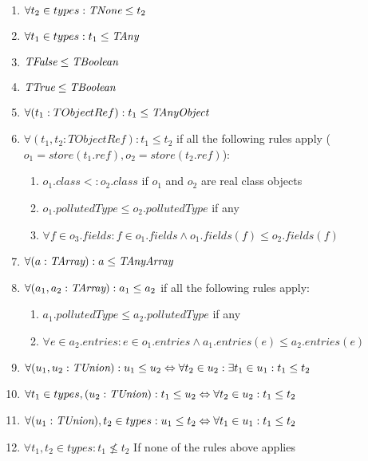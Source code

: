 \documentclass[a4paper]{article}
\begin{document}
\begin{enumerate}
  \item $\forall t_2 \in types : \emph{TNone} \leq t_2$
  \item $\forall t_1 \in types : t_1 \leq \emph{TAny}$
  \item $\emph{TFalse} \leq \emph{TBoolean}$
  \item $\emph{TTrue} \leq \emph{TBoolean}$
  \item $\forall (t_1:  TObjectRef): t_1 \leq \emph{TAnyObject}$
  \item $\forall (t_1,t_2: TObjectRef): t_1 \leq t_2$
    if all the following rules apply ($o_1 = store(t_1.ref), o_2 = store(t_2.ref)$):
    \begin{enumerate}
        \item $o_1.class <: o_2.class$ if $o_1$ and $o_2$ are real class objects
        \item $o_1.pollutedType \leq o_2.pollutedType$ if any
        \item $\forall f \in o_3.fields: f \in o_1.fields \wedge o_1.fields(f)
          \leq o_2.fields(f)$
    \end{enumerate}
  \item $\forall (a: \emph{TArray}) : a \leq \emph{TAnyArray}$
  \item $\forall (a_1,a_2: \emph{TArray}) : a_1 \leq a_2$
    if all the following rules apply:
    \begin{enumerate}
        \item $a_1.pollutedType \leq a_2.pollutedType$ if any
        \item $\forall e \in a_2.entries: e \in o_1.entries \wedge a_1.entries(e)
          \leq a_2.entries(e)$
    \end{enumerate}
  \item $\forall (u_1,u_2: \emph{TUnion}) : u_1 \leq u_2 \Leftrightarrow \forall t_2 \in u_2: \exists t_1 \in u_1: t_1 \leq t_2$
  \item $\forall t_1 \in types, (u_2: \emph{TUnion}) : t_1 \leq u_2 \Leftrightarrow \forall t_2 \in u_2: t_1 \leq t_2$
  \item $\forall (u_1: \emph{TUnion}), t_2 \in types : u_1 \leq t_2 \Leftrightarrow \forall t_1 \in u_1: t_1 \leq t_2$
  \item $\forall t_1,t_2 \in types : t_1 \nleq t_2$ If none of the rules above applies
\end{enumerate}
\end{document}
